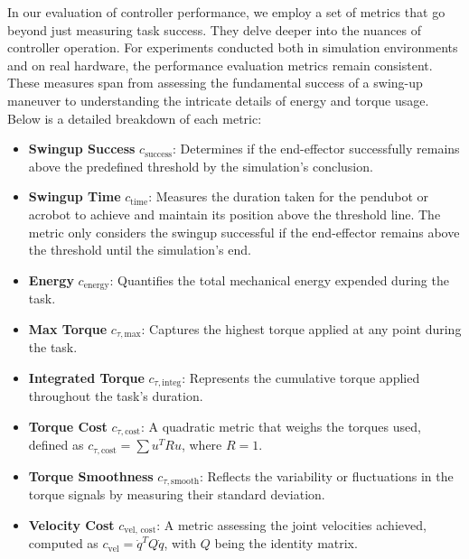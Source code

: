 In our evaluation of controller performance, we employ a set of metrics that go beyond just measuring task success. They delve deeper into the nuances of controller operation. For experiments conducted both in simulation environments and on real hardware, the performance evaluation metrics remain consistent. These measures span from assessing the fundamental success of a swing-up maneuver to understanding the intricate details of energy and torque usage. Below is a detailed breakdown of each metric:

\begin{itemize}
  \item \textbf{Swingup Success} \(c_{\text{success}}\):
  Determines if the end-effector successfully remains above the predefined threshold by the simulation's conclusion.
  
  \item \textbf{Swingup Time} \(c_{\text{time}}\):
  Measures the duration taken for the pendubot or acrobot to achieve and maintain its position above the threshold line. The metric only considers the swingup successful if the end-effector remains above the threshold until the simulation's end.
  
  \item \textbf{Energy} \(c_{\text{energy}}\):
  Quantifies the total mechanical energy expended during the task.
  
  \item \textbf{Max Torque} \(c_{\tau, \text{max}}\):
  Captures the highest torque applied at any point during the task.
  
  \item \textbf{Integrated Torque} \(c_{\tau, \text{integ}}\):
  Represents the cumulative torque applied throughout the task's duration.
  
  \item \textbf{Torque Cost} \(c_{\tau, \text{cost}}\):
  A quadratic metric that weighs the torques used, defined as \(c_{\tau, \text{cost}} = \sum u^TRu\), where \(R = 1\).
  
  \item \textbf{Torque Smoothness} \(c_{\tau, \text{smooth}}\):
  Reflects the variability or fluctuations in the torque signals by measuring their standard deviation.
  
  \item \textbf{Velocity Cost} \(c_{\text{vel, cost}}\):
  A metric assessing the joint velocities achieved, computed as \(c_{\text{vel}} = \dot{q}^T Q \dot{q}\), with \(Q\) being the identity matrix.
\end{itemize}

